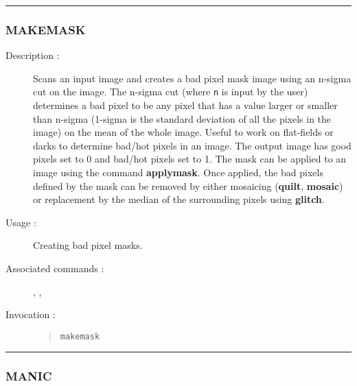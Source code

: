 \hrule 
\subsubsection*{\label{MAKEMASK}MAKEMASK}

\begin{description}

\item[Description :] Scans an input image and creates a bad pixel mask
image using an n-sigma cut on the image.  The n-sigma cut (where {\tt n} is
input by the user) determines a bad pixel to be any pixel that has a
value larger or smaller than n-sigma (1-sigma is the standard deviation
of all the pixels in the image) on the mean of the whole image.  Useful
to work on flat-fields or darks to determine bad/hot pixels in an
image.  The output image has good pixels set to 0 and bad/hot pixels
set to 1.  The mask can be applied to an image using the command
{\bf applymask}.  Once applied, the bad pixels defined by the mask can be
removed by either mosaicing ({\bf quilt}, {\bf mosaic}) or replacement by the
median of the surrounding pixels using {\bf glitch}.

\item[Usage :] Creating bad pixel masks.

\item[Associated commands :] {\tt {}}, 
{\tt {}}, {\tt {}}

\item[Invocation :]

\begin{quote}{\tt  makemask }\end{quote}

\end{description}

\hrule 
\subsubsection*{\label{MANIC}MANIC}

